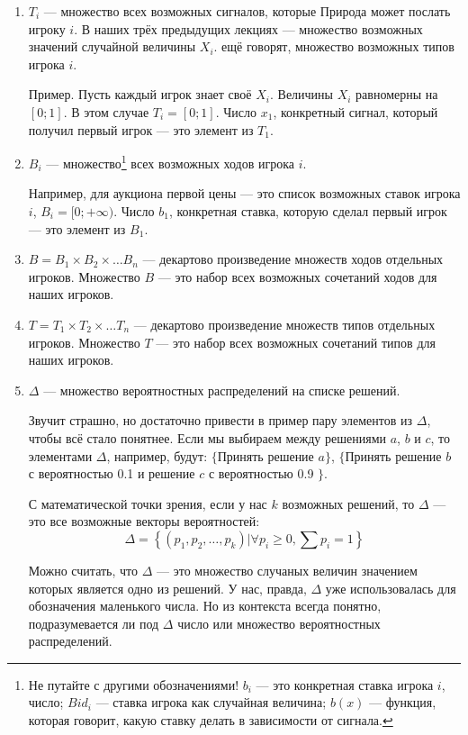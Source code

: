 \begin{enumerate}
\item $ T_{i} $ — множество всех возможных сигналов, которые Природа может послать игроку $ i $. В наших трёх предыдущих лекциях — множество возможных значений случайной величины $ X_{i} $. ещё говорят, множество возможных типов игрока $ i $.

Пример. Пусть каждый игрок знает своё $ X_{i} $. Величины $ X_{i}  $ равномерны на $ [0;1] $. В этом случае $ T_{i}=[0;1] $. Число $ x_{1} $, конкретный сигнал, который получил первый игрок — это элемент из $ T_{1} $.
\item $ B_{i} $ — множество\footnote{Не путайте с другими обозначениями! $ b_{i} $ — это конкретная ставка игрока $ i $, число; $ Bid_{i} $ — ставка игрока как случайная величина; $ b(x) $ — функция, которая говорит, какую ставку делать в зависимости от сигнала.}  всех возможных ходов игрока $ i $.

Например, для аукциона первой цены — это список возможных ставок игрока $ i $, $ B_{i}=[0;+\infty) $. Число $ b_{1} $, конкретная ставка, которую сделал первый игрок — это элемент из $ B_{1} $.

\item $ B=B_{1}\times B_{2}\times \ldots B_{n} $ — декартово произведение множеств ходов отдельных игроков. Множество $B$ — это набор всех возможных сочетаний ходов для наших игроков.

\item $ T=T_{1}\times T_{2}\times \ldots T_{n} $ — декартово произведение множеств типов отдельных игроков. Множество $T$ — это набор всех возможных сочетаний типов для наших игроков.

\item $ \Delta $ — множество вероятностных распределений на списке решений.

Звучит страшно, но достаточно привести в пример пару элементов из $ \Delta $, чтобы всё стало понятнее. Если мы выбираем между решениями $ a $, $ b $ и $ c $, то элементами $ \Delta $, например, будут: $ \{ $Принять решение $ a\} $, $ \{ $Принять решение $ b $ с вероятностью 0.1 и решение $c$ с вероятностью 0.9 $ \}$.

С математической точки зрения, если у нас $ k $ возможных решений, то $ \Delta $ — это все возможные векторы вероятностей:
\begin{equation}
\Delta=\left\{(p_{1},p_{2},\ldots,p_{k})|\forall p_{i}\geq 0, \sum p_{i}=1 \right\}
\end{equation}

Можно считать, что $ \Delta $ — это множество случаных величин значением которых является одно из решений.
У нас, правда, $ \Delta $ уже использовалась для обозначения маленького числа. Но из контекста всегда понятно, подразумевается ли под $ \Delta $ число или множество вероятностных распределений.

\end{enumerate}

